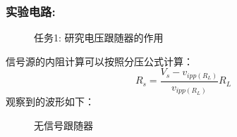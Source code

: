 \documentclass[a4paper,11pt,UTF8]{article}
\begin{document}
\subsubsection{实验电路:}
\begin{figure}[H]
	\centering
	\setcounter{subfigure}{0}
	\caption*{任务1: 研究电压跟随器的作用}
\end{figure}
信号源的内阻计算可以按照分压公式计算：
$$
	R_s=\frac{V_s-v_{ipp(R_L)}}{v_{ipp(R_L)}}R_L
$$
观察到的波形如下：
\begin{figure}[H]
	\centering
	\setcounter{subfigure}{0}

	\caption*{无信号跟随器}
\end{figure}
\end{document}
